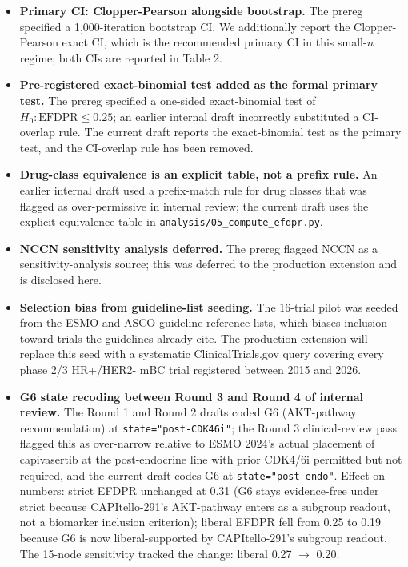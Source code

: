 \documentclass[11pt,a4paper]{article}
\begin{document}
\begin{itemize}
  commits to a Benjamini-Hochberg correction at $q = 0.05$ across S1, S2, S3.
  In the present pilot S1 (ODI) is reported as a per-biomarker mean Jaccard
  distance with bootstrap CI; S2 (temporal lag) and S3 (subgroup coverage)
  are reported descriptively because the small corpus precludes a meaningful
  formal test.
\item \textbf{Primary CI: Clopper-Pearson alongside bootstrap.} The prereg
  specified a 1,000-iteration bootstrap CI. We additionally report the
  Clopper-Pearson exact CI, which is the recommended primary CI in this
  small-$n$ regime; both CIs are reported in Table 2.
\item \textbf{Pre-registered exact-binomial test added as the formal primary
  test.} The prereg specified a one-sided exact-binomial test of $H_0:
  \mathrm{EFDPR} \le 0.25$; an earlier internal draft incorrectly substituted
  a CI-overlap rule. The current draft reports the exact-binomial test as the
  primary test, and the CI-overlap rule has been removed.
\item \textbf{Drug-class equivalence is an explicit table, not a prefix rule.}
  An earlier internal draft used a prefix-match rule for drug classes that was
  flagged as over-permissive in internal review; the current draft uses the
  explicit equivalence table in \texttt{analysis/05\_compute\_efdpr.py}.
\item \textbf{NCCN sensitivity analysis deferred.} The prereg flagged NCCN
  as a sensitivity-analysis source; this was deferred to the production
  extension and is disclosed here.
\item \textbf{Selection bias from guideline-list seeding.} The 16-trial pilot
  was seeded from the ESMO and ASCO guideline reference lists, which biases
  inclusion toward trials the guidelines already cite. The production extension
  will replace this seed with a systematic ClinicalTrials.gov query covering
  every phase 2/3 HR+/HER2- mBC trial registered between 2015 and 2026.
\item \textbf{G6 state recoding between Round 3 and Round 4 of internal review.}
  The Round 1 and Round 2 drafts coded G6 (AKT-pathway recommendation) at
  \texttt{state="post-CDK46i"}; the Round 3 clinical-review pass flagged this
  as over-narrow relative to ESMO 2024's actual placement of capivasertib at
  the post-endocrine line with prior CDK4/6i permitted but not required, and
  the current draft codes G6 at \texttt{state="post-endo"}. Effect on numbers:
  strict EFDPR unchanged at 0.31 (G6 stays evidence-free under strict because
  CAPItello-291's AKT-pathway enters as a subgroup readout, not a biomarker
  inclusion criterion); liberal EFDPR fell from 0.25 to 0.19 because G6 is
  now liberal-supported by CAPItello-291's subgroup readout. The 15-node
  sensitivity tracked the change: liberal 0.27 $\to$ 0.20.
\end{itemize}
\end{document}
